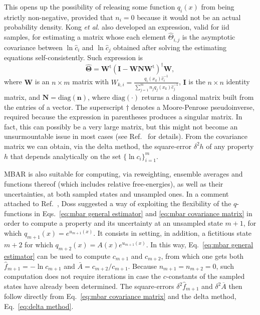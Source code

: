 \documentclass[aip,jcp,reprint,amsmath,amssymb]{revtex4-1}
\newcommand{\mt}[1]{\boldsymbol{\mathbf{#1}}}           %
\newcommand{\vt}[1]{\boldsymbol{\mathbf{#1}}}           %
\newcommand{\tr}[1]{#1^\text{t}}                        %
\begin{document}
This opens up the possibility of releasing some function $q_i(x)$ from being strictly non-negative, provided that $n_i = 0$ because it would not be an actual probability density. Kong \textit{et al}.\cite{Kong_2003} also developed an expression, valid for iid samples, for estimating a matrix whose each element $\hat \Theta_{i,j}$ is the asymptotic covariance between $\ln \hat c_i$ and $\ln \hat c_j$ obtained after solving the estimating equations self-consistently. Such expression is
\begin{equation}
\label{eq:mbar covariance matrix}
\hat{\mt \Theta} = \tr{\mt W} (\mt I - {\mt W}{\mt N}\tr{\mt W})^\dag {\mt W},
\end{equation}
where $\mt W$ is an $n \times m$ matrix with $W_{k,i} = \frac{q_i(x_k) \hat c_i^{-1}}{\sum_{j=1}^m n_j q_j(x_k) \hat c_j^{-1}}$, $\mt I$ is the $n \times n$ identity matrix, and $\mt N = \text{diag}(\vt n)$, where $\text{diag}(\cdot)$ returns a diagonal matrix built from the entries of a vector. The superscript $\dag$ denotes a Moore-Penrose pseudoinverse, required because the expression in parentheses produces a singular matrix. In fact, this can possibly be a very large matrix, but this might not become an unsurmountable issue in most cases (see Ref.~ for details). From the covariance matrix we can obtain, via the delta method, the square-error $\delta^2 h$ of any property $h$ that depends analytically on the set $\{\ln c_i\}_{i=1}^m$.

MBAR is also suitable for computing, via reweighting, ensemble averages and functions thereof (which includes relative free-energies), as well as their uncertainties, at both sampled states and unsampled ones. In a comment attached to Ref.~, Doss suggested a way of exploiting the flexibility of the $q$-functions in Eqs.~\eqref{eq:mbar general estimator} and \eqref{eq:mbar covariance matrix} in order to compute a property and its uncertainty at an unsampled state $m+1$, for which $q_{m+1}(x) = e^{u_{m+1}(x)}$. It consists in setting, in addition, a fictitious state $m+2$ for which $q_{m+2}(x) = A(x)e^{u_{m+1}(x)}$. In this way, Eq.~\eqref{eq:mbar general estimator} can be used to compute $c_{m+1}$ and $c_{m+2}$, from which one gets both $\hat f_{m+1} = -\ln c_{m+1}$ and $\bar A = {c_{m+2}}/{c_{m+1}}$. Because $n_{m+1} = n_{m+2} = 0$, such computation does not require iterations in case the $c$-constants of the sampled states have already been determined. The square-errors $\delta^2 \hat f_{m+1}$ and $\delta^2 \overline A$ then follow directly from Eq.~\eqref{eq:mbar covariance matrix} and the delta method, Eq.~\eqref{eq:delta method}.
\end{document}
